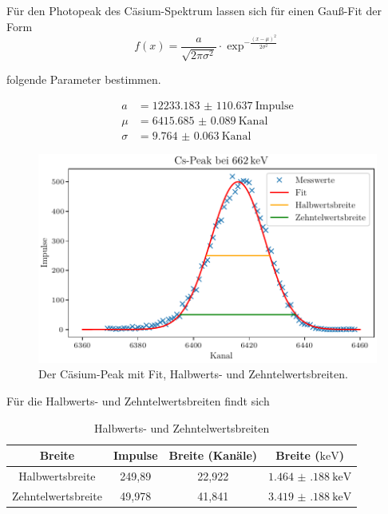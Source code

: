 Für den Photopeak des Cäsium-Spektrum lassen sich für einen Gauß-Fit der Form
\begin{equation}
    f(x) = \frac{a}{\sqrt{2\pi \sigma^2}} \cdot \exp^{-\frac{(x-\mu)^2}{2\sigma^2}}
    \label{eq:gauß}
\end{equation}

folgende Parameter bestimmen.

\begin{align}
    a &= \qty{12233.183(110637)}{\text{Impulse}} \\
    \mu &= \qty{6415.685(89)}{\text{Kanal}} \\
    \sigma &= \qty{9.764(63)}{\text{Kanal}}
\end{align}

\begin{figure}[H]
    \centering
    \includegraphics[width=\textwidth]{plots/CsPeak.pdf}
    \caption{Der Cäsium-Peak mit Fit, Halbwerts- und Zehntelwertsbreiten.}
    \label{fig:cspeak}
\end{figure}

Für die Halbwerts- und Zehntelwertsbreiten findt sich
\begin{table}[H]
    \centering
    \caption{Halbwerts- und Zehntelwertsbreiten}
    \label{tab:breiten}
    \begin{tabular}{c c c c}
        \toprule
        {Breite} & {Impulse} & {Breite (Kanäle)} & {Breite ($\si{\kilo\electronvolt}$)} \\
        \midrule
        Halbwertsbreite & 249,89 & 22,922 & $\qty{1.464(188)}{\kilo\electronvolt}$ \\
        Zehntelwertsbreite & 49,978 & 41,841 & $\qty{3.419(188)}{\kilo\electronvolt}$ \\
        \bottomrule
    \end{tabular}
\end{table}

